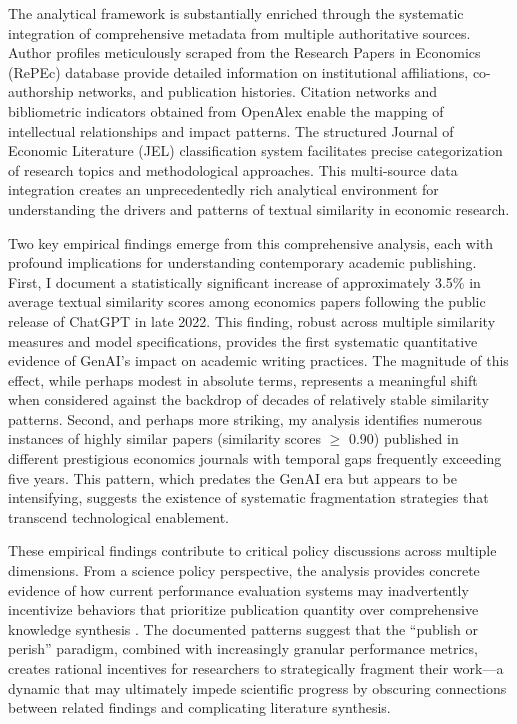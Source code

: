 \documentclass[12pt]{article}
\begin{document}
The analytical framework is substantially enriched through the systematic integration of comprehensive metadata from multiple authoritative sources. Author profiles meticulously scraped from the Research Papers in Economics (RePEc) database provide detailed information on institutional affiliations, co-authorship networks, and publication histories. Citation networks and bibliometric indicators obtained from OpenAlex enable the mapping of intellectual relationships and impact patterns. The structured Journal of Economic Literature (JEL) classification system facilitates precise categorization of research topics and methodological approaches. This multi-source data integration creates an unprecedentedly rich analytical environment for understanding the drivers and patterns of textual similarity in economic research.

Two key empirical findings emerge from this comprehensive analysis, each with profound implications for understanding contemporary academic publishing. First, I document a statistically significant increase of approximately 3.5\% in average textual similarity scores among economics papers following the public release of ChatGPT in late 2022. This finding, robust across multiple similarity measures and model specifications, provides the first systematic quantitative evidence of GenAI's impact on academic writing practices. The magnitude of this effect, while perhaps modest in absolute terms, represents a meaningful shift when considered against the backdrop of decades of relatively stable similarity patterns. Second, and perhaps more striking, my analysis identifies numerous instances of highly similar papers (similarity scores $\geq$ 0.90) published in different prestigious economics journals with temporal gaps frequently exceeding five years. This pattern, which predates the GenAI era but appears to be intensifying, suggests the existence of systematic fragmentation strategies that transcend technological enablement.

These empirical findings contribute to critical policy discussions across multiple dimensions. From a science policy perspective, the analysis provides concrete evidence of how current performance evaluation systems may inadvertently incentivize behaviors that prioritize publication quantity over comprehensive knowledge synthesis \citep{johnson2019incentives, anderson2021tenure, moosa2018publish}. The documented patterns suggest that the ``publish or perish'' paradigm, combined with increasingly granular performance metrics, creates rational incentives for researchers to strategically fragment their work—a dynamic that may ultimately impede scientific progress by obscuring connections between related findings and complicating literature synthesis.
\end{document}
